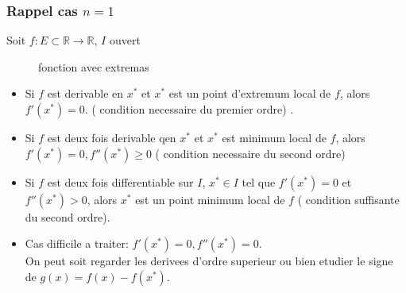 \documentclass[../main.tex]{subfiles}
\begin{document}
\subsubsection*{Rappel cas $n=1$}
Soit $f: E \subset \mathbb{R}\to \mathbb{R}$, $I$ ouvert
\begin{figure}[H]
    \centering
    \caption{fonction avec extremas}
    \label{fig:fonction-avec-extremas}
\end{figure}
\begin{itemize}
	\item Si $f$ est derivable en $x^{*}$ et $x^{*}$ est un point d'extremum local de $f$, alors $f'( x^{*}) =0$. ( condition necessaire du premier ordre) .
	\item Si $f$ est deux fois derivable qen $x^{*}$ et $x^{*}$ est  minimum local de $f$, alors $f'( x^{*}) =0, f''( x^{*}) \geq 0$ ( condition necessaire du second ordre) 
	\item Si $f$ est deux fois differentiable sur $I$, $x^{*} \in I$ tel que $f'( x^{*}) =0$ et $f''( x^{*}) >0$, alors $x^{*}$ est un point minimum local de $f$ ( condition suffisante du second ordre).
	\item Cas difficile a traiter: $f'( x^{*}) =0, f''( x^{*}) =0$.\\
		On peut soit regarder les derivees d'ordre superieur ou bien etudier le signe de $g( x) = f( x) - f( x^{*}) $.
\end{itemize}
\end{document}
